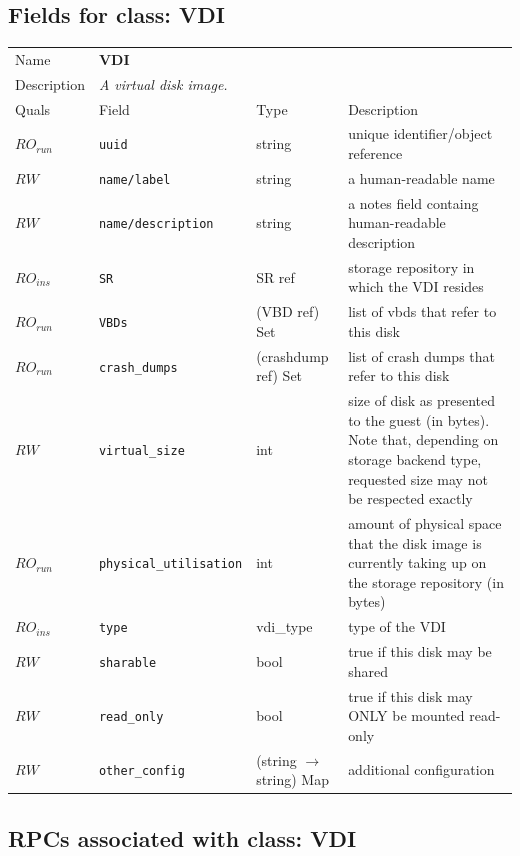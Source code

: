 \subsection{Fields for class: VDI}
\begin{longtable}{|lllp{}|}
\hline
\multicolumn{1}{|l}{Name} & \multicolumn{3}{l|}{\bf VDI} \\
\multicolumn{1}{|l}{Description} & \multicolumn{3}{l|}{\parbox{11cm}{\em A
virtual disk image.}} \\
\hline
Quals & Field & Type & Description \\
\hline
$\mathit{RO}_\mathit{run}$ &  {\tt uuid} & string & unique identifier/object reference \\
$\mathit{RW}$ &  {\tt name/label} & string & a human-readable name \\
$\mathit{RW}$ &  {\tt name/description} & string & a notes field containg human-readable description \\
$\mathit{RO}_\mathit{ins}$ &  {\tt SR} & SR ref & storage repository in which the VDI resides \\
$\mathit{RO}_\mathit{run}$ &  {\tt VBDs} & (VBD ref) Set & list of vbds that refer to this disk \\
$\mathit{RO}_\mathit{run}$ &  {\tt crash\_dumps} & (crashdump ref) Set & list of crash dumps that refer to this disk \\
$\mathit{RW}$ &  {\tt virtual\_size} & int & size of disk as presented to the guest (in bytes). Note that, depending on storage backend type, requested size may not be respected exactly \\
$\mathit{RO}_\mathit{run}$ &  {\tt physical\_utilisation} & int & amount of physical space that the disk image is currently taking up on the storage repository (in bytes) \\
$\mathit{RO}_\mathit{ins}$ &  {\tt type} & vdi\_type & type of the VDI \\
$\mathit{RW}$ &  {\tt sharable} & bool & true if this disk may be shared \\
$\mathit{RW}$ &  {\tt read\_only} & bool & true if this disk may ONLY be mounted read-only \\
$\mathit{RW}$ &  {\tt other\_config} & (string $\rightarrow$ string) Map & additional configuration \\
\hline
\end{longtable}
\subsection{RPCs associated with class: VDI}
